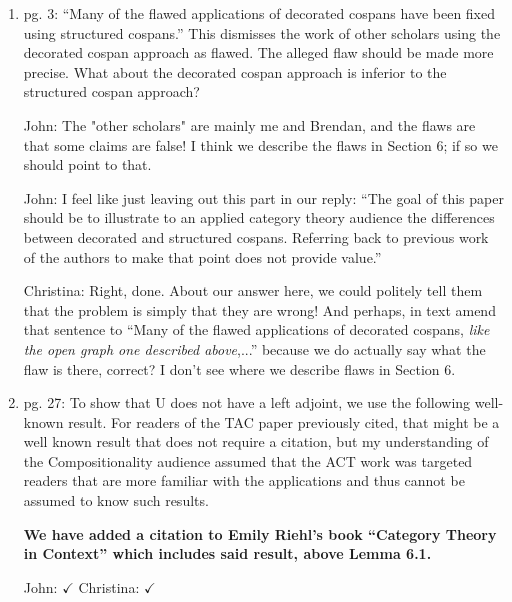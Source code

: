 \documentclass[reqno]{amsart}
\def\chris{\color{purple} Christina: }
\def\john{\color{red} John: }
\begin{document}
\begin{enumerate}
{\chris Sounds good to me! See above, amend at will.}

\item pg. 3: “Many of the flawed applications of decorated cospans have been fixed using structured cospans.” This dismisses the work of other 
scholars 
using the decorated cospan approach as flawed. The alleged flaw should be made more precise. What about the decorated cospan approach is inferior to 
the structured cospan approach? 

{\john The "other scholars" are mainly me and Brendan, and the flaws are that some claims are false! I think we describe the flaws in Section 6; if so 
we should point to that.}   

{\john I feel like just leaving out this part in our reply: ``The goal of this paper should be to illustrate to an applied category theory audience the differences between 
decorated and structured cospans. Referring back to previous work of the authors to make that point does not provide value.''}

{\chris Right, done. About our answer here, we could politely tell them that the problem is simply that they are wrong! And perhaps, in 
text amend that sentence to ``Many of the flawed applications of decorated cospans, \emph{like the open graph one described above},...'' because we 
do actually say what the flaw is there, correct? I don't see where we describe flaws in Section 6.}

\item pg. 27: To show that U does not have a left adjoint, we use the following well-known result. For readers of the TAC paper previously cited, 
that might 
be a well known result that does not require a citation, but my understanding of the Compositionality audience assumed that the ACT work was targeted 
readers that are more familiar with the applications and thus cannot be assumed to know such results.

{\bf We have added a citation to Emily Riehl's book ``Category Theory in Context'' which includes said result, above Lemma 6.1.}  


{\john $\checkmark$} {\chris $\checkmark$}


\end{enumerate}
\end{document}
